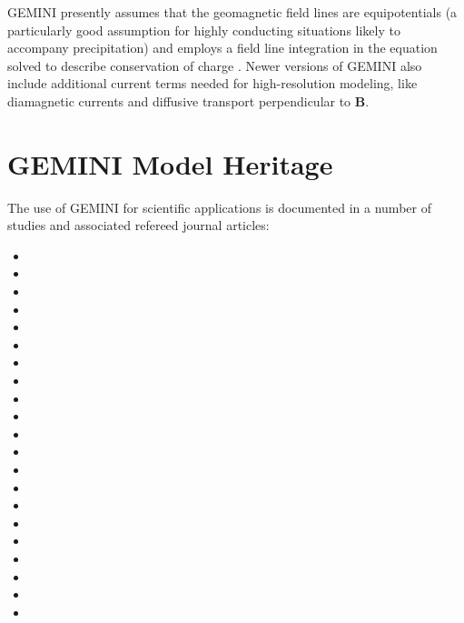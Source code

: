 \documentclass[11pt,letterpaper]{article}
\begin{document}
GEMINI presently assumes that the geomagnetic field lines are equipotentials (a particularly good assumption for highly conducting situations likely to accompany precipitation) and employs a field line integration in the equation solved to describe conservation of charge \citep[cf.][Equation 1]{Zettergren:2015}.  Newer versions of GEMINI also include additional current terms needed for high-resolution modeling, like diamagnetic currents and diffusive transport perpendicular to $\mathbf{B}$. 



\section{GEMINI Model Heritage}

The use of GEMINI for scientific applications is documented in a number of studies and associated refereed journal articles:  
\begin{itemize}
  \item {}
  \item {}
  \item {}
  \item {}
  \item {}
  \item {}
  \item {}
  \item {}
  \item {}
  \item {}
  \item {}
  \item {}  
  \item {}  
  \item {}  
  \item {} 
  \item {}   
  \item {} 
  \item {} 
  \item {} 
  \item {} 
  \item {}  
\end{itemize}
\end{document}
